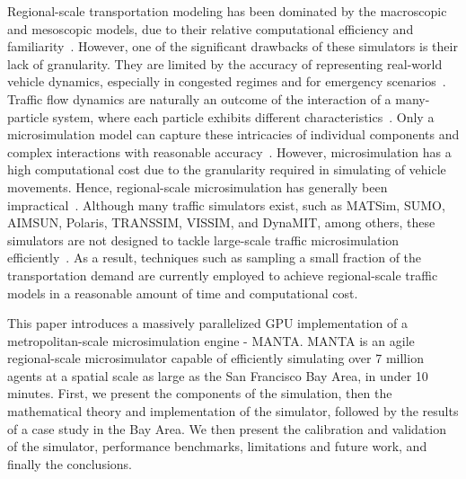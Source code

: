 \documentclass[final]{IEEEtran}
\begin{document}
Regional-scale transportation modeling has been dominated by the macroscopic and mesoscopic models, due to their relative computational efficiency and familiarity~\cite{kotusevskiReviewTrafficSimulation2009}. However, one of the significant drawbacks of these simulators is their lack of granularity. They are limited by the accuracy of representing real-world vehicle dynamics, especially in congested regimes and for emergency scenarios~\cite{toledoMicroscopicTrafficSimulation2005, axhausenActivityBasedApproaches1992}. Traffic flow dynamics are naturally an outcome of the interaction of a many-particle system, where each particle exhibits different characteristics~\cite{yangMicroscopicTrafficSimulator1996}. Only a microsimulation model can capture these intricacies of individual components and complex interactions with reasonable accuracy~\cite{loderUnderstandingTrafficCapacity2019, yangMicroscopicTrafficSimulator1996, toledoMicroscopicTrafficSimulation2005, geroliminisIdentificationAnalysisQueue2011}. However, microsimulation has a high computational cost due to the granularity required in simulating of vehicle movements. Hence, regional-scale microsimulation has generally been impractical~\cite{saidallahComparativeStudyUrban2016, kokkinogenisNextgenerationTrafficSimulation2011}. Although many traffic simulators exist, such as MATSim, SUMO, AIMSUN, Polaris, TRANSSIM, VISSIM, and DynaMIT, among others, these simulators are not designed to tackle large-scale traffic microsimulation efficiently~\cite{Horni2016, dlr46740, barceloDynamicNetworkSimulation2005, auldPOLARISAgentbasedModeling2016, saxenaProblemSolvingUncertainty2016, parkMicroscopicSimulationModel2003, ben-akivaDynaMITSimulationbasedSystem1998}. As a result, techniques such as sampling a small fraction of the transportation demand are currently employed to achieve regional-scale traffic models in a reasonable amount of time and computational cost.

This paper introduces a massively parallelized GPU implementation of a metropolitan-scale microsimulation engine - MANTA. MANTA is an agile regional-scale microsimulator capable of efficiently simulating over 7 million agents at a spatial scale as large as the San Francisco Bay Area, in under 10 minutes. First, we present the components of the simulation, then the mathematical theory and implementation of the simulator, followed by the results of a case study in the Bay Area. We then present the calibration and validation of the simulator, performance benchmarks, limitations and future work, and finally the conclusions.
\end{document}
